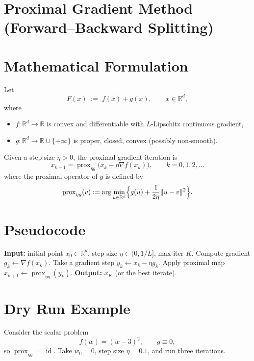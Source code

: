 \documentclass{article}
\begin{document}
\section*{Proximal Gradient Method (Forward–Backward Splitting)}

\section*{Mathematical Formulation}
Let 
\[
F(x)\;:=\;f(x)+g(x),\qquad x\in\mathbb{R}^{d},
\]
where  

\begin{itemize}[noitemsep]
\item $f:\mathbb{R}^{d}\to\mathbb{R}$ is convex and differentiable with $L$‑Lipschitz continuous gradient,
\item $g:\mathbb{R}^{d}\to\mathbb{R}\cup\{+\infty\}$ is proper, closed, convex (possibly non‑smooth).
\end{itemize}
Given a step size $\eta>0$, the proximal gradient iteration is
\begin{equation}
\boxed{
x_{k+1}= \operatorname{prox}_{\eta g}\!\bigl(x_{k}-\eta\nabla f(x_{k})\bigr)},
\qquad k=0,1,2,\dots
\label{eq:update}
\end{equation}
where the proximal operator of $g$ is defined by
\[
\operatorname{prox}_{\eta g}(v):=
\arg\min_{u\in\mathbb{R}^{d}}\Bigl\{ g(u)+\frac{1}{2\eta}\|u-v\|^{2}\Bigr\}.
\]

\section*{Pseudocode}
\begin{algorithm}[H]
\caption{Proximal Gradient Method}
\begin{algorithmic}[1]
\STATE \textbf{Input:} initial point $x_{0}\in\mathbb{R}^{d}$, step size $\eta\in(0,1/L]$, max iter $K$.
    \STATE Compute gradient $g_{k}\gets\nabla f(x_{k})$.
    \STATE Take a gradient step $y_{k}\gets x_{k}-\eta g_{k}$.
    \STATE Apply proximal map $x_{k+1}\gets \operatorname{prox}_{\eta g}(y_{k})$.
\ENDFOR
\STATE \textbf{Output:} $x_{K}$ (or the best iterate).
\end{algorithmic}
\end{algorithm}

\section*{Dry Run Example}
Consider the scalar problem
\[
f(w)=(w-3)^{2},\qquad g\equiv0,
\]
so $\operatorname{prox}_{\eta g}= \operatorname{id}$.  
Take $w_{0}=0$, step size $\eta=0.1$, and run three iterations.
\end{document}
